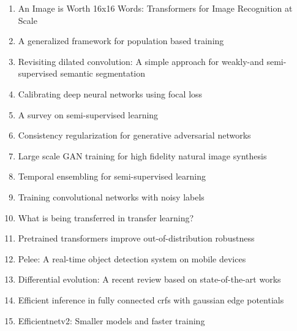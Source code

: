 \documentclass[acmlarge]{acmart}
\begin{document}
\begin{enumerate}
	\item An Image is Worth 16x16 Words: Transformers for Image Recognition at Scale \cite{Dosovitskiy2021AnII} 

	\item A generalized framework for population based training \cite{li2019generalized} 

	\item Revisiting dilated convolution: A simple approach for weakly-and semi-supervised semantic segmentation \cite{wei2018revisiting} 

	\item Calibrating deep neural networks using focal loss \cite{mukhoti2020calibrating} 

	\item A survey on semi-supervised learning \cite{van2020survey} 

	\item Consistency regularization for generative adversarial networks \cite{zhang2019consistency} 

	\item Large scale GAN training for high fidelity natural image synthesis \cite{brock2018large} 

	\item Temporal ensembling for semi-supervised learning \cite{laine2016temporal} 

	\item Training convolutional networks with noisy labels \cite{sukhbaatar2014training} 

	\item What is being transferred in transfer learning? \cite{neyshabur2020being} 

	\item Pretrained transformers improve out-of-distribution robustness \cite{hendrycks2020pretrained} 

	\item Pelee: A real-time object detection system on mobile devices \cite{wang2018pelee} 

	\item Differential evolution: A recent review based on state-of-the-art works \cite{ahmad2021differential} 

	\item Efficient inference in fully connected crfs with gaussian edge potentials \cite{krahenbuhl2011efficient} 

	\item Efficientnetv2: Smaller models and faster training \cite{tan2021efficientnetv2} 


\end{enumerate}
\end{document}
